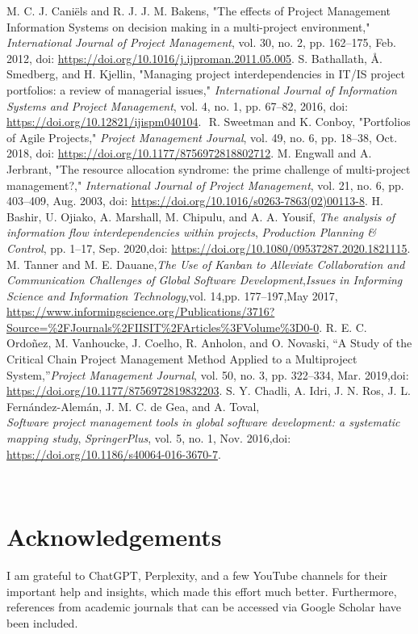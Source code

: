 \documentclass{llncs}
\begin{document}
\begin{thebibliography}{5}
  M. C. J. Caniëls and R. J. J. M. Bakens, "The effects of Project Management Information Systems on decision making in a multi-project environment," \textit{International Journal of Project Management}, vol. 30, no. 2, pp. 162–175, Feb. 2012, doi: \url{https://doi.org/10.1016/j.ijproman.2011.05.005}.
  S. Bathallath, Å. Smedberg, and H. Kjellin, "Managing project interdependencies in IT/IS project portfolios: a review of managerial issues," \textit{International Journal of Information Systems and Project Management}, vol. 4, no. 1, pp. 67–82, 2016, doi: \url{https://doi.org/10.12821/ijispm040104}.
‌
  R. Sweetman and K. Conboy, "Portfolios of Agile Projects," \textit{Project Management Journal}, vol. 49, no. 6, pp. 18–38, Oct. 2018, doi: \url{https://doi.org/10.1177/8756972818802712}.
 M. Engwall and A. Jerbrant, "The resource allocation syndrome: the prime challenge of multi-project management?," \textit{International Journal of Project Management}, vol. 21, no. 6, pp. 403–409, Aug. 2003, doi: \url{https://doi.org/10.1016/s0263-7863(02)00113-8}.
H. Bashir, U. Ojiako, A. Marshall, M. Chipulu, and A. A. Yousif,
\textit{The analysis of information flow interdependencies within projects},
\textit{Production Planning \& Control}, pp. 1–17, Sep. 2020,doi: \url{https://doi.org/10.1080/09537287.2020.1821115}.
 M. Tanner and M. E. Dauane,\textit{The Use of Kanban to Alleviate Collaboration and Communication Challenges of Global Software Development},\textit{Issues in Informing Science and Information Technology},vol. 14,pp. 177–197,May 2017,
\url{https://www.informingscience.org/Publications/3716?Source=%2FJournals%2FIISIT%2FArticles%3FVolume%3D0-0}.
R. E. C. Ordoñez, M. Vanhoucke, J. Coelho, R. Anholon, and O. Novaski,
``A Study of the Critical Chain Project Management Method Applied to a Multiproject System,''\emph{Project Management Journal}, vol. 50, no. 3, pp. 322–334, Mar. 2019,doi: \url{https://doi.org/10.1177/8756972819832203}.
S. Y. Chadli, A. Idri, J. N. Ros, J. L. Fernández-Alemán, J. M. C. de Gea, and A. Toval, \\ \emph{Software project management tools in global software development: a systematic mapping study}, \emph{SpringerPlus}, vol. 5, no. 1, Nov. 2016,doi: \url{https://doi.org/10.1186/s40064-016-3670-7}.

‌
‌
‌
\end{thebibliography}



\section{Acknowledgements}
I am grateful to ChatGPT, Perplexity, and a few YouTube channels for their important help and insights, which made this effort much better. Furthermore, references from academic journals that can be accessed via Google Scholar have been included.
\end{document}
